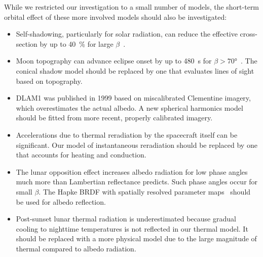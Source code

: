 While we restricted our investigation to a small number of models, the short-term orbital effect of these more involved models should also be investigated:
\begin{itemize}
    \item Self-shadowing, particularly for solar radiation, can reduce the effective cross-section by up to \qty{40}{\percent} for large $\beta$~\cite{Mazarico2018}.
    \item Moon topography can advance eclipse onset by up to \qty{480}{\s} for $\beta > \ang{70}$~\cite{Mazarico2018}. The conical shadow model should be replaced by one that evaluates lines of sight based on topography.
    \item \gls{DLAM1} was published in 1999 based on miscalibrated Clementine imagery, which overestimates the actual albedo. A new spherical harmonics model should be fitted from more recent, properly calibrated imagery.
    \item Accelerations due to thermal reradiation by the spacecraft itself can be significant. Our model of instantaneous reradiation should be replaced by one that accounts for heating and conduction.
    \item The lunar opposition effect increases albedo radiation for low phase angles much more than Lambertian reflectance predicts. Such phase angles occur for small $\beta$. The Hapke \gls{BRDF} with spatially resolved parameter maps~\cite{Sato2014} should be used for albedo reflection.
    \item Post-sunset lunar thermal radiation is underestimated because gradual cooling to nighttime temperatures is not reflected in our thermal model. It should be replaced with a more physical model due to the large magnitude of thermal compared to albedo radiation.
\end{itemize}



\FloatBarrier

